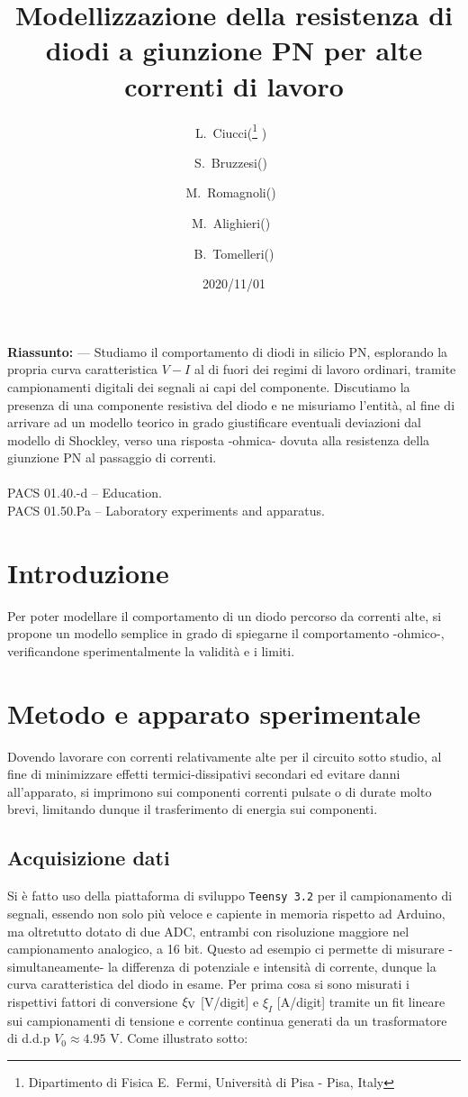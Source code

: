 \documentclass{article}[a4paper, oneside, 11pt]
\title{Modellizzazione della resistenza di diodi a giunzione PN per alte correnti di lavoro}
\author{L.~Ciucci(\thanks{Dipartimento di Fisica E.~Fermi, Universit\`a di Pisa - Pisa, Italy} )~\and S.~Bruzzesi(\protect\footnotemark[1] )~\and M.~Romagnoli(\protect\footnotemark[1] )~\and M.~Alighieri(\protect\footnotemark[1] )~\and B.~Tomelleri(\protect\footnotemark[1] )}
\date{2020/11/01}
\begin{document}
\maketitle

\begin{mdframed}
\textbf{Riassunto:} --- Studiamo il comportamento di diodi in silicio PN,
esplorando la propria curva caratteristica $V - I$ al di fuori dei regimi di
lavoro ordinari, tramite campionamenti digitali dei segnali ai capi del
componente. Discutiamo la presenza di una componente resistiva del diodo e ne
misuriamo l'entità, al fine di arrivare ad un modello teorico in grado
giustificare eventuali deviazioni dal modello di Shockley, verso una risposta
-ohmica- dovuta alla resistenza della giunzione PN al passaggio di correnti.\\\\
PACS 01.40.-d – Education.\\
PACS 01.50.Pa – Laboratory experiments and apparatus.
\end{mdframed}

\section{Introduzione}
Per poter modellare il comportamento di un diodo percorso da correnti alte, si
propone un modello semplice in grado di spiegarne il comportamento -ohmico-,
verificandone sperimentalmente la validità e i limiti.
\section{Metodo e apparato sperimentale}
Dovendo lavorare con correnti relativamente alte per il circuito sotto studio,
al fine di minimizzare effetti termici-dissipativi secondari ed evitare danni
all'apparato, si imprimono sui componenti correnti pulsate o di durate molto
brevi, limitando dunque il trasferimento di energia sui componenti.
\subsection{Acquisizione dati}
Si è fatto uso della piattaforma di sviluppo \verb+Teensy 3.2+\cite{teensy} per
il campionamento di segnali, essendo non solo più veloce e capiente in memoria
rispetto ad Arduino, ma oltretutto dotato di due ADC, entrambi con risoluzione
maggiore nel campionamento analogico, a 16 bit. Questo ad esempio ci permette
di misurare -simultaneamente- la differenza di potenziale e intensità di
corrente, dunque la curva caratteristica del diodo in esame. Per prima cosa si
sono misurati i rispettivi fattori di conversione $\xi_{\rm V}$ [V/digit] e
$\xi_I$ [A/digit] tramite un fit lineare sui campionamenti di tensione e
corrente continua generati da un trasformatore di d.d.p $V_0 \approx 4.95$ V.
Come illustrato sotto:

\end{document}
